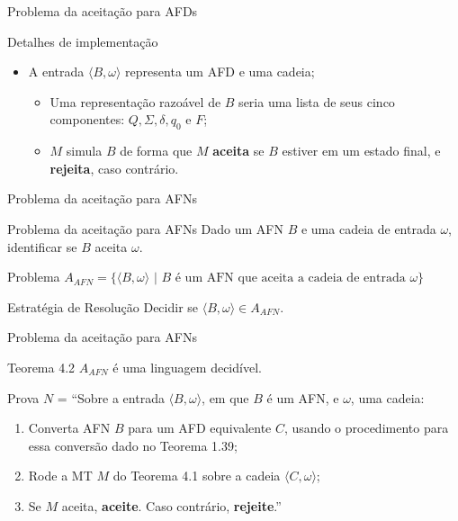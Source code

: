 \documentclass[xcolor=dvipsnames,table]{beamer}
\begin{document}
	\begin{frame}{Problema da aceitação para AFDs}
		\begin{block}{Detalhes de implementação}
			\begin{itemize}
				\item A entrada $\langle B, \omega \rangle$ representa um AFD e uma cadeia;
				\begin{itemize}
					\item Uma representação razoável de $B$ seria uma lista de seus cinco componentes: $Q, \Sigma, \delta, q_0$ e $F$;
					\item $M$ simula $B$ de forma que $M$ {\bf aceita} se $B$ estiver em um estado final, e {\bf rejeita}, caso contrário.
				\end{itemize}
			\end{itemize}
		\end{block}
	\end{frame}
	
	\begin{frame}{Problema da aceitação para AFNs}
		\begin{block}{Problema da aceitação para AFNs}
			Dado um AFN $B$ e uma cadeia de entrada $\omega$, identificar se $B$ aceita $\omega$.
		\end{block}	\pause
		\begin{block}{Problema}
			$A_{AFN} = \{ \langle B, \omega \rangle \mbox{ | } B \mbox{ é um AFN que aceita a cadeia de entrada } \omega \}$
		\end{block} \pause
		\begin{block}{Estratégia de Resolução}
			Decidir se $\langle B, \omega \rangle \in A_{AFN}$.
		\end{block}
	\end{frame}	
	
	\begin{frame}{Problema da aceitação para AFNs}
		\begin{block}{Teorema 4.2}
			$A_{AFN}$ é uma linguagem decidível.
		\end{block} \pause
		\begin{block}{Prova}
			$N$ = ``Sobre a entrada $\langle B, \omega \rangle$, em que $B$ é um AFN, e $\omega$, uma cadeia:
			\begin{enumerate}
				\item Converta AFN $B$ para um AFD equivalente $C$, usando o procedimento para essa conversão dado no Teorema 1.39;
				\item Rode a MT $M$ do Teorema 4.1 sobre a cadeia $\langle C, \omega \rangle$;
				\item Se $M$ aceita, {\bf aceite}. Caso contrário, {\bf rejeite}.''
			\end{enumerate}
		\end{block}
	\end{frame}
	
\end{document}
